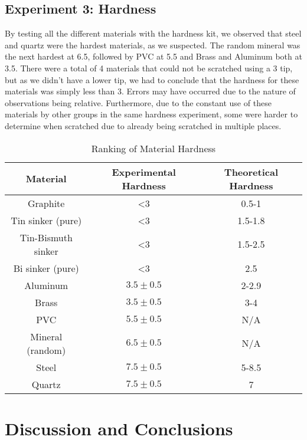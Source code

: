 \documentclass{article}
\begin{document}
\subsection{Experiment 3: Hardness}
By testing all the different materials with the hardness kit, we observed that steel and quartz were the hardest materials, as we suspected. The random mineral was the next hardest at 6.5, followed by PVC at 5.5 and Brass and Aluminum both at 3.5. There were a total of 4 materials that could not be scratched using a 3 tip, but as we didn’t have a lower tip, we had to conclude that the hardness for these materials was simply less than 3. Errors may have occurred due to the nature of observations being relative. Furthermore, due to the constant use of these materials by other groups in the same hardness experiment, some were harder to determine when scratched due to already being scratched in multiple places. 


{\renewcommand{\arraystretch}{1.2}
\begin{table}[H]
\begin{center}
\begin{tabular}{c|c|c}
Material & Experimental Hardness & Theoretical Hardness\\
\hline
Graphite & <3 & 0.5-1\\
Tin sinker (pure) & <3 & 1.5-1.8\\
Tin-Bismuth sinker &  <3 & 1.5-2.5\\
Bi sinker (pure) & <3 & 2.5\\
Aluminum & $3.5 \pm 0.5$ & 2-2.9\\
Brass &  $3.5 \pm 0.5$ & 3-4\\
PVC & $5.5 \pm 0.5$ & N/A\\
Mineral (random) & $6.5 \pm 0.5$ & N/A\\
Steel &  $7.5 \pm 0.5$ & 5-8.5\\
Quartz & $7.5 \pm 0.5$ & 7\\
\end{tabular}
\caption{Ranking of Material Hardness}
\end{center}
\end{table}}

\section{Discussion and Conclusions}
\end{document}
